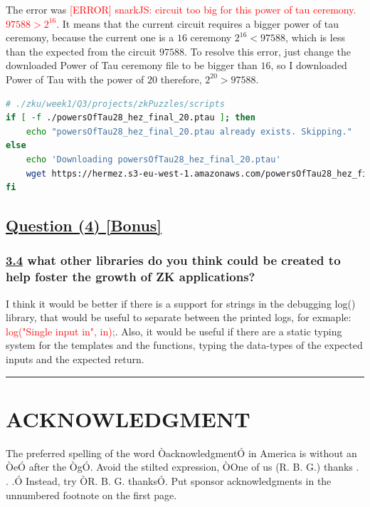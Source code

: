 \documentclass[letterpaper, 10 pt, conference]{ieeeconf}  %
\begin{document}
The error was \textcolor{red}{[ERROR] snarkJS: circuit too big for this power of tau ceremony. $97588 > 2^{16}$}.
It means that the current circuit requires a bigger power of tau ceremony, because the current one is a $16$ ceremony $2^{16} < 97588$, which is less than the expected from the circuit $97588$. To resolve this error, just change the downloaded Power of Tau ceremony file to be bigger than $16$, so I downloaded Power of Tau with the power of $20$ therefore, $2^{20} > 97588$.

\begin{lstlisting}[language=Bash, caption=Expected solution]
# ./zku/week1/Q3/projects/zkPuzzles/scripts
if [ -f ./powersOfTau28_hez_final_20.ptau ]; then
    echo "powersOfTau28_hez_final_20.ptau already exists. Skipping."
else
    echo 'Downloading powersOfTau28_hez_final_20.ptau'
    wget https://hermez.s3-eu-west-1.amazonaws.com/powersOfTau28_hez_final_20.ptau
fi
\end{lstlisting}

\subsection{\textbf{\underline{Question (4) [Bonus]}}}
\subsubsection{\textbf{\underline{3.4} what other libraries do you think could be created to help foster the growth of ZK applications?}}

I think it would be better if there is a support for strings in the debugging log() library, that would be useful to separate between the printed logs, for exmaple: \textcolor{red}{log("Single input in",  in);}.
Also, it would be useful if there are a static typing system for the templates and the functions, typing the data-types of the expected inputs and the expected return.

\noindent\rule{8cm}{0.4pt}

\section*{ACKNOWLEDGMENT}
The preferred spelling of the word ÒacknowledgmentÓ in America is without an ÒeÓ after the ÒgÓ. Avoid the stilted expression, ÒOne of us (R. B. G.) thanks . . .Ó  Instead, try ÒR. B. G. thanksÓ. Put sponsor acknowledgments in the unnumbered footnote on the first page.
\end{document}
